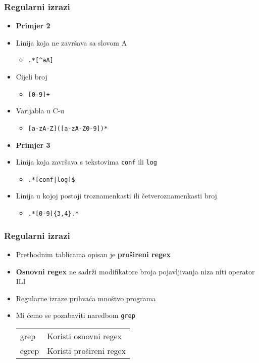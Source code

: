 \documentclass[table,usenames,dvipsnames]{beamer}
\newcommand{\shell}[1]{\texttt{#1}}
\begin{document}
\begin{frame}[t]
\frametitle{Regularni izrazi}
\begin{itemize}
  \item \textbf{Primjer 2}
  \item[] Linija koja ne završava sa slovom A 
  \begin{itemize}
    \item[] \shell{.*[\textasciicircum{}aA]}
  \end{itemize}
  \item[] Cijeli broj
  \begin{itemize}
    \item[] \shell{[0-9]+}
  \end{itemize}
  \item[] Varijabla u C-u
  \begin{itemize}
    \item[] \shell{[a-zA-Z]([a-zA-Z0-9])*}
  \end{itemize}
\end{itemize}
\vfill
\begin{itemize}
  \item \textbf{Primjer 3}
  \item[] Linija koja završava s tekstovima \shell{conf} ili \shell{log}
  \begin{itemize}
  	\item[] \shell{.*[conf|log]\$}
  \end{itemize}
  \item[] Linija u kojoj postoji troznamenkasti ili četveroznamenkasti broj
  \begin{itemize}
  	\item[] \shell{.*[0-9]\{3,4\}.*}
  \end{itemize}
\end{itemize}
\vfill
\end{frame}

\begin{frame}[t]
\frametitle{Regularni izrazi}
\begin{itemize}
	\item Prethodnim tablicama opisan je \textbf{prošireni regex}
	\item \textbf{Osnovni regex} ne sadrži modifikatore broja pojavljivanja niza niti operator ILI
\end{itemize}
\begin{itemize}
  \item Regularne izraze prihvaća mnoštvo programa
  \item Mi ćemo se pozabaviti naredbom \shell{grep}
  \begin{tabular}{l l}
    grep  &  Koristi osnovni regex\\
    egrep &  Koristi prošireni regex
  \end{tabular}
\end{itemize}
\end{frame}
  
\end{document}
